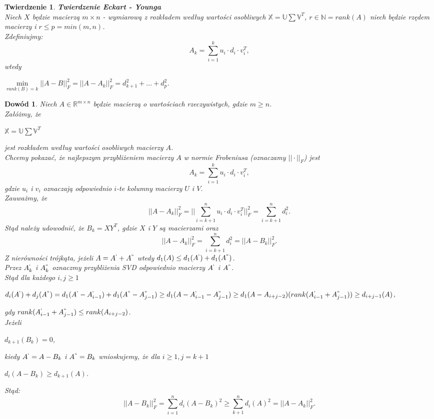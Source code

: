\documentclass[12pt,a4paper]{report}
\newtheorem{tw}{Twierdzenie}
\newtheorem{dw}{Dowód}
\begin{document}
\begin{tw}\textbf{Twierdzenie Eckart - Younga}%
\\Niech $X$ będzie macierzą $m \times n$ - wymiarową z rozkładem według wartości osobliwych $\mathbb{X}=\mathbb{U}\sum \mathbb{V}^T$, $r\in \mathbb{N} = rank(A)$ niech będzie rzędem macierzy i $r\leq p = min(m,n)$.
\\Zdefiniujmy:
$$A_k = \sum_{i=1}^k u_i\cdot d_i \cdot v_i^T,$$
wtedy
\begin{center}
$\min \limits_{rank(B) = k } ||A - B||_F^2 = ||A - A_k||_F^2 = d_{k+1}^2 + ... + d_p^2$.
\end{center}
\end{tw}
\begin{dw}
Niech $A \in \mathbb{R}^{m\times n}$ będzie macierzą o wartościach rzeczywistych, gdzie $m\geq n$.
\\Załóżmy, że
\begin{center}
$\mathbb{X}=\mathbb{U}\sum \mathbb{V}^T$
\end{center} 
jest rozkładem według wartości osobliwych macierzy $A$.
\\Chcemy pokazać, że najlepszym przybliżeniem macierzy $A$ w normie Frobeniusa (oznaczamy $||\cdot||_F$) jest
$$A_k = \sum_{i=1}^k u_i\cdot d_i \cdot v_i^T,$$
gdzie $u_i$ i $v_i$ oznaczają odpowiednio $i$-te kolumny macierzy $U$ i $V$.
\\Zauważmy, że
$$||A - A_k||_F^2 = ||\sum_{i=k+1}^n u_i \cdot d_i \cdot v_i^T||_F^2 = \sum_{i=k+1}^n d_i^2.$$
Stąd należy udowodnić, że $B_k = XY^T$, gdzie $X$ i $Y$ są macierzami oraz 
$$||A - A_k||_F^2 = \sum_{i=k+1}^n d_i^2 = ||A - B_k||_F^2.$$
Z nierówności trójkąta, jeżeli $A = A^{`} + A^{``}$ wtedy $d_1(A)\leq d_1(A^{`}) + d_1(A^{``})$. 
\\Przez $A_k^{`}$ i $A_k^{``}$ oznaczmy przybliżenia SVD odpowiednio macierzy $A^{`}$ i $A^{``}$. 
\\Stąd dla każdego $i,j \geq 1$
\begin{center}
$d_i(A^{`}) + d_j(A^{``}) = d_1(A^{`} - A_{i-1}^{`}) + d_1(A^{``} - A_{j-1}^{``})
\geq d_1(A-A_{i-1}^{`} - A_{j-1}^{``})
\geq d_1(A-A_{i+j-2})(rank(A_{i-1}^{`} + A_{j-1}^{``}))
\geq d_{i+j-1}(A)$,
\end{center}
gdy $rank(A_{i-1}^{`} + A_{j-1}^{``}) \leq rank (A_{i+j-2})$.
\\Jeżeli 
\begin{center}
$d_{k+1}(B_k)=0$,
\end{center} 
kiedy $A^{`} = A - B_k$ i $A^{``} = B_k$ wnioskujemy, że dla $i\geq 1, j= k+1$
\begin{center}
$d_i(A-B_k)\geq d_{k+1}(A)$.
\end{center}
Stąd:
$$||A - B_k||_F^2 = \sum_{i=1}^n d_i(A-B_k)^2\geq \sum_{k+1}^nd_i(A)^2 = ||A-A_k||_F^2.$$
\end{dw}
\end{document}
